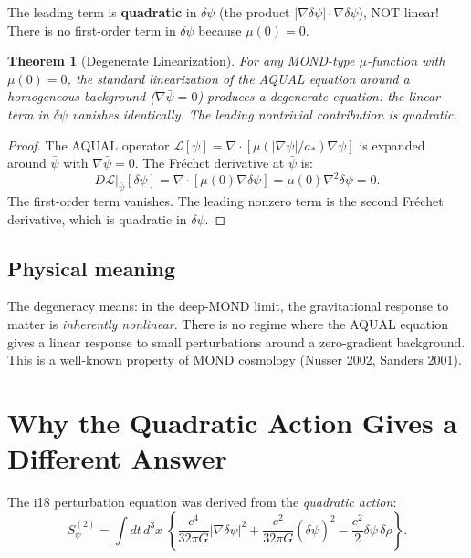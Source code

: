 \documentclass[11pt]{article}
\newtheorem{theorem}{Theorem}
\newcommand{\dpsi}{\delta\psi}
\newcommand{\astar}{a_*}
\begin{document}
The leading term is \textbf{quadratic} in $\dpsi$ (the product
$|\nabla\dpsi| \cdot \nabla\dpsi$), NOT linear! There is no
first-order term in $\dpsi$ because $\mu(0) = 0$.

\begin{theorem}[Degenerate Linearization]
\label{thm:degenerate}
For any MOND-type $\mu$-function with $\mu(0) = 0$, the standard
linearization of the AQUAL equation around a homogeneous background
($\nabla\bar\psi = 0$) produces a degenerate equation: the linear
term in $\dpsi$ vanishes identically. The leading nontrivial contribution
is quadratic.
\end{theorem}

\begin{proof}
The AQUAL operator $\mathcal{L}[\psi] = \nabla\cdot[\mu(|\nabla\psi|/\astar)
\nabla\psi]$ is expanded around $\bar\psi$ with $\nabla\bar\psi = 0$.
The Fr\'echet derivative at $\bar\psi$ is:
\begin{equation}
D\mathcal{L}|_{\bar\psi}[\dpsi]
= \nabla\cdot\left[\mu(0)\nabla\dpsi\right]
= \mu(0)\nabla^2\dpsi = 0.
\end{equation}
The first-order term vanishes. The leading nonzero term is the second
Fr\'echet derivative, which is quadratic in $\dpsi$.
\end{proof}

\subsection{Physical meaning}

The degeneracy means: in the deep-MOND limit, the gravitational response
to matter is \emph{inherently nonlinear}. There is no regime where
the AQUAL equation gives a linear response to small perturbations around
a zero-gradient background. This is a well-known property of MOND
cosmology (Nusser 2002, Sanders 2001).


\section{Why the Quadratic Action Gives a Different Answer}

The i18 perturbation equation was derived from the \emph{quadratic action}:
\begin{equation}
S^{(2)}_\psi = \int dt\,d^3x\;\left\{
  \frac{c^4}{32\pi G}|\nabla\dpsi|^2
  + \frac{c^2}{32\pi G}(\delta\dot\psi)^2
  - \frac{c^2}{2}\dpsi\,\delta\rho
\right\}.
\label{eq:S2}
\end{equation}
\end{document}
